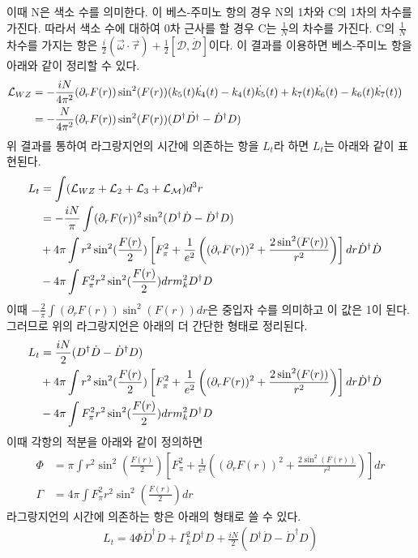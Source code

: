 \documentclass[superscriptaddress,
nofootinbib,byrevtex,fleqn,prd,12pt]{revtex4}
\begin{document}
이때 N은 색소 수를 의미한다. 이 베스-주미노 항의 경우 N의 1차와 C의 1차의 차수를 가진다. 따라서 색소 수에 대하여 0차 근사를 할 경우 C는 $ \frac{1}{N}$의 차수를 가진다.
C의 $\frac{1}{N}$ 차수를 가지는 항은 $ \frac{i}{2}(\vec{\omega} \cdot \vec{\tau})+ \frac{1}{2}[\mathcal{D},\mathcal{\dot{D}}]$이다. 이 결과를 이용하면
베스-주미노 항을 아래와 같이 정리할 수 있다.
\begin{align}
  \mathcal{L}_{WZ} &= - \frac{iN}{4\pi^{2}}(\partial_{r}F(r)) \sin^{2} (F(r))(k_{5}(t)\dot{k_{4}}(t)-k_{4}(t) \dot{k_{5}}(t)+ k_{7}(t) \dot{k_{6}}(t) -k_{6}(t)\dot{k_{7}}(t)) \cr
  &= - \frac{N}{ 4\pi^{2}}(\partial_{r}F(r)) \sin^{2} (F(r))(D^{\dagger}\dot{D^{\dagger}}-\dot{D}^{\dagger}D)
\end{align}
위 결과를 통하여 라그랑지언의 시간에 의존하는 항을 $ L_{t}$라 하면 $L_{t}$는 아래와 같이 표현된다.
\begin{align}
  L_{t} &=   \int (\mathcal{L}_{WZ} + \mathcal{L}_{2} + \mathcal{L}_{3} + \mathcal{L}_{\mathcal{M}}) d^{3}r \cr
  &= - \frac{i N}{\pi} \int (\partial_{r}F(r))^{2} \sin^{2} (D^{\dagger}\dot{D}-\dot{D}^{\dagger}D) \cr
  &+ 4\pi \int r^{2} \sin^{2}(\frac{F(r)}{2}) \left[F_{\pi}^{2} + \frac{1}{e^{2}}\left((\partial_{r}F(r))^{2} +\frac{2 \sin^{2}(F(r))}{r^{2}} \right) \right]dr
   \dot{D}^{\dagger} \dot{D} \cr
   & - 4 \pi \int F_{\pi}^{2} r^{2} \sin^{2} (\frac{F(r)}{2})dr m_{k}^{2} D^{\dagger}D
\end{align}
이때 $- \frac{2}{\pi}\int (\partial_{r} F(r))\sin^{2}(F(r))dr $은 중입자 수를 의미하고 이 값은 1이 된다. 그러므로 위의 라그랑지언은 아래의 더 간단한 형태로 정리된다.
\begin{align}
  L_{t}  &= \frac{iN}{2} (D^{\dagger}\dot{D}-\dot{D}^{\dagger}D) \cr
  &+ 4\pi \int r^{2} \sin^{2}(\frac{F(r)}{2}) \left[F_{\pi}^{2} + \frac{1}{e^{2}}\left((\partial_{r}F(r))^{2} +\frac{2 \sin^{2}(F(r))}{r^{2}} \right) \right]dr
   \dot{D}^{\dagger} \dot{D} \cr
   & - 4 \pi \int F_{\pi}^{2} r^{2} \sin^{2} (\frac{F(r)}{2})dr m_{k}^{2} D^{\dagger}D
\end{align}
이때 각항의 적분을 아래와 같이 정의하면
\begin{align}
  \Phi &= \pi \int r^{2} \sin^{2}(\frac{F(r)}{2}) \left[F_{\pi}^{2} + \frac{1}{e^{2}}\left((\partial_{r}F(r))^{2} +\frac{2 \sin^{2}(F(r))}{r^{2}} \right) \right]dr \\
  \Gamma &=  4 \pi \int F_{\pi}^{2} r^{2} \sin^{2} (\frac{F(r)}{2})dr
\end{align}
라그랑지언의 시간에 의존하는 항은 아래의 형태로 쓸 수 있다.
\begin{align}
  L_{t} = 4 \Phi \dot{D}^{\dagger}\dot{D}+ \Gamma_{k}^{2}D^{\dagger}D + \frac{iN}{2}(D^{\dagger}\dot{D}-\dot{D}^{\dagger}D)
\end{align}
\end{document}
